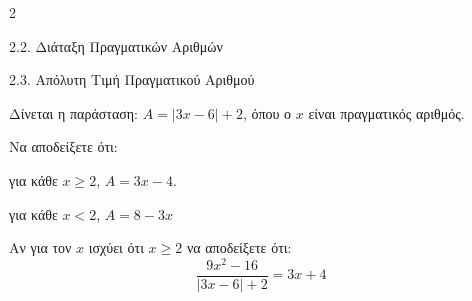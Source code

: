 \begin{ylh}{2}
    \item 2.2. Διάταξη Πραγματικών Αριθμών
    \item 2.3. Απόλυτη Τιμή Πραγματικού Αριθμού
\end{ylh}
Δίνεται η παράσταση: ${A} = |3x - 6| + 2$, όπου ο $x$ είναι πραγματικός αριθμός.
\begin{alist}
\item Να αποδείξετε ότι:

\begin{rlist}
\item για κάθε $x \ge 2$, ${A} = 3x - 4$.

\item για κάθε $x < 2$, ${A} = 8 - 3x$
\end{rlist}
\item Αν για τον $x$ ισχύει ότι $x \ge 2$ να αποδείξετε ότι:
\[ \dfrac{9x^2 - 16}{|3x - 6| + 2} = 3x + 4 \]
\end{alist}

